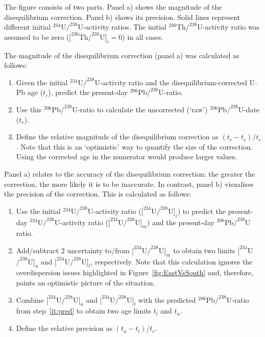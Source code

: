 \documentclass[11pt]{article}
\begin{document}
The figure consists of two parts. Panel a) shows the magnitude of the
disequilibrium correction.  Panel b) shows its precision.  Solid lines
represent different initial ${}^{234}$U${/}^{238}$U-activity
ratios. The initial ${}^{230}$Th${/}^{238}$U-activity ratio was
assumed to be zero ($[^{230}$Th${/}^{238}$U$]_i=0$) in all
cases.

The magnitude of the disequilibrium correction (panel a) was
calculated as follows:

\begin{enumerate}
\item Given the initial ${}^{234}$U${/}^{238}$U-activity ratio and the
  disequilibrium-corrected U--Pb age ($t_c$), predict the present-day
  ${}^{206}$Pb${/}^{238}$U-ratio.
\item Use this ${}^{206}$Pb${/}^{238}$U-ratio to calculate the
  uncorrected (`raw') ${}^{206}$Pb${/}^{238}$U-date ($t_r$).
\item Define the relative magnitude of the disequilibrium correction
  as $(t_r-t_c)/t_c$. Note that this is an `optimistic' way to
  quantify the size of the correction.  Using the corrected age in the
  numerator would produce larger values.
\end{enumerate}

Panel a) relates to the accuracy of the disequilibrium correction: the
greater the correction, the more likely it is to be inaccurate. In
contrast, panel b) visualises the precision of the correction. This is
calculated as follows:

\begin{enumerate}
\item\label{it:pred} Use the initial ${}^{234}$U${/}^{238}$U-activity
  ratio ($[^{234}$U${/}^{238}$U$]_i$) to predict the present-day
  ${}^{234}$U${/}^{238}$U-activity ratio
  ($[^{234}$U${/}^{238}$U$]_m$) and the present-day
  ${}^{206}$Pb${/}^{238}$U ratio.
\item Add/subtract 2\permil{} uncertainty to/from
  $[^{234}$U${/}^{238}$U$]_m$ to obtain two limits
  $[^{234}$U${/}^{238}$U$]_u$ and $[^{234}$U${/}^{238}$U$]_l$,
  respectively. Note that this calculation ignores the overdispersion
  issues highlighted in Figure~\ref{fig:EastVsSouth} and, therefore,
  paints an optimistic picture of the situation.
\item Combine $[^{234}$U${/}^{238}$U$]_u$ and
  $[^{234}$U${/}^{238}$U$]_l$ with the predicted
  ${}^{206}$Pb${/}^{238}$U-ratio from step~\ref{it:pred} to obtain two
  age limits $t_l$ and $t_u$.
\item Define the relative precision as $(t_u-t_l)/t_c$.
\end{enumerate}
\end{document}
